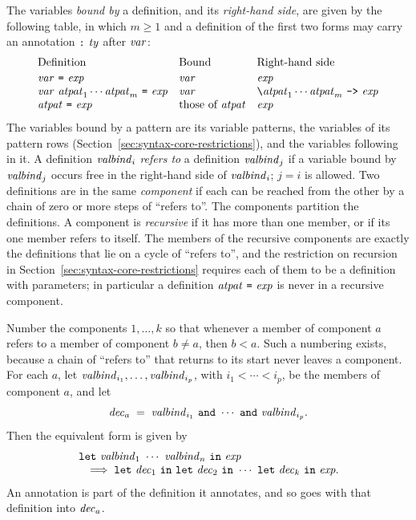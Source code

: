 The variables \emph{bound by} a definition, and its \emph{right-hand side},
are given by the following table, in which $m\geq 1$ and a definition of the
first two forms may carry an annotation $\textnormal{\texttt{:}}\ \mathit{ty}$ after $\mathit{var}$:
\[
  \begin{array}{lll}
    \text{Definition} & \text{Bound} & \text{Right-hand side}\\[2pt]
    \var\ \kw{=}\ \expm
      & \var & \expm\\
    \var\ \atpat_1\cdots\atpat_m\ \kw{=}\ \expm
      & \var & \kw{\textbackslash}\atpat_1\cdots\atpat_m\ \kw{->}\ \expm\\
    \atpat\ \kw{=}\ \expm
      & \text{those of}\ \atpat & \expm
  \end{array}
\]
The variables bound by a pattern are its variable patterns, the variables of
its pattern rows (Section~\ref{sec:syntax-core-restrictions}), and the
variables following  in it.
A definition $\mathit{valbind}_i$ \emph{refers to} a definition $\mathit{valbind}_j$ if a
variable bound by $\mathit{valbind}_j$ occurs free in the right-hand side of
$\mathit{valbind}_i$; $j=i$ is allowed. Two definitions are in the same
\emph{component} if each can be reached from the other by a chain of zero or
more steps of ``refers to''. The components partition the definitions. A
component is \emph{recursive} if it has more than one member, or if its one
member refers to itself. The members of the recursive components are exactly
the definitions that lie on a cycle of ``refers to'', and the restriction on
recursion in Section~\ref{sec:syntax-core-restrictions} requires each of them
to be a definition with parameters; in particular a definition
$\mathit{atpat}\ \textnormal{\texttt{=}}\ \mathit{exp}$ is never in a recursive component. %

Number the components $1,\ldots,k$ so that whenever a member of component $a$
refers to a member of component $b\neq a$, then $b<a$. Such a numbering
exists, because a chain of ``refers to'' that returns to its start never
leaves a component. For each $a$, let
$\mathit{valbind}_{i_1},\ldots,\mathit{valbind}_{i_p}$, with $i_1<\cdots<i_p$, be the members
of component $a$, and let
\[
  \dec_a \;=\; \valbind_{i_1}\ \kw{and}\ \cdots\ \kw{and}\ \valbind_{i_p}.
\]
Then the equivalent form is given by
\[
  \begin{array}{l}
    \textnormal{\texttt{let}}\ \mathit{valbind}_1\ \cdots\ \mathit{valbind}_n\ \textnormal{\texttt{in}}\ \mathit{exp}\\
    \quad\Longrightarrow\;
    \textnormal{\texttt{let}}\ \mathit{dec}_1\ \textnormal{\texttt{in}}\ \textnormal{\texttt{let}}\ \mathit{dec}_2\ \textnormal{\texttt{in}}\ \cdots\
    \textnormal{\texttt{let}}\ \mathit{dec}_k\ \textnormal{\texttt{in}}\ \mathit{exp} .
  \end{array}
\]
An annotation is part of the definition it annotates, and so goes with that
definition into $\mathit{dec}_a$.

